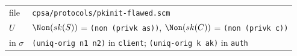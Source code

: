 \par\smallskip\noindent\begin{tabular}{@{}l p{}@{}}
file & \texttt{cpsa/protocols/pkinit-flawed.scm}\\
$U$ & $\Non(sk(S))$ = \texttt{(non (privk as))}, $\Non(sk(C))$ = \texttt{(non (privk c))}\\
in $\sigma$ & \texttt{(uniq-orig n1 n2)} in \texttt{client}; \texttt{(uniq-orig k ak)} in \texttt{auth}\\
\end{tabular}

